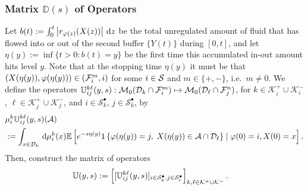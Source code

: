 \subsubsection{Matrix $\mathbb D(s)$ of Operators}
Let $b(t) := \int_0^t \left| r_{\varphi(z)}(X(z)) \right|  \, \mathrm{d} z$ be the total unregulated amount of fluid that has flowed into or out of the second buffer $\{Y(t)\}$ during $[0,t]$, and let $\eta(y) := \inf \{t > 0: b(t) = y\}$ be the first time this accumulated in-out amount hits level $y$. Note that at the stopping time \(\eta(y)\) it must be that \((X({\eta(y)}),\varphi({\eta(y)}))\in(\mathcal{F}_i^m,i)\) for some \(i\in\mathcal{S}\) and \(m\in\{+,-\}\), i.e.~\(m\neq0\). We define the operators $\mathbb{U}_{ij}^{k\ell}(y,s): \mathcal{M}_0(\mathcal{D}_{k}\cap\mathcal{F}_i^m) \mapsto \mathcal{M}_0 (\mathcal{D}_\ell\cap\mathcal{F}_j^n)$, for $k\in\mathcal K_i^+\cup\mathcal K_i^-$,  $\ell\in\mathcal K_j^+\cup\mathcal K_j^-$, and $i \in \mathcal{S}_k^\bullet,\,j \in \mathcal{S}_k^\bullet$, by 
% 
	\begin{align*} 
		&\mu_i^{k}\mathbb{U}_{ij}^{k\ell} (y,s) (\mathcal{A}) 
		\\&:= \int_{x \in \mathcal{D}_k} \, \mathrm{d}  \mu_i^{k}(x) \mathbb{E}\left[e^{-s\eta(y)}{1}\left\{\varphi({\eta(y)}) = j, \; X({\eta(y)}) \in \mathcal{A}\cap\mathcal{D}_\ell\right\} \mid \varphi(0) = i, X(0) = x\right].
	\end{align*} 
Then, construct the matrix of operators 
\begin{align*}
\mathbb U(y,s) &:= \left[[\mathbb U_{ij}^{k\ell}(y,s)]_{i\in\mathcal{S}_k^\bullet,j\in\mathcal{S}_\ell^\bullet}\right]_{k,\ell\in\mathcal K^+\cup\mathcal K^-}.\end{align*}

